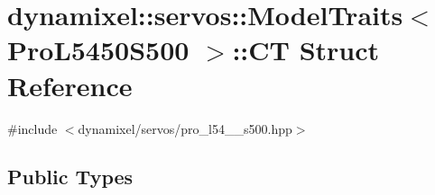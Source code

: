 \hypertarget{structdynamixel_1_1servos_1_1_model_traits_3_01_pro_l5450_s500_01_4_1_1_c_t}{}\section{dynamixel\+:\+:servos\+:\+:Model\+Traits$<$ Pro\+L5450\+S500 $>$\+:\+:C\+T Struct Reference}
\label{structdynamixel_1_1servos_1_1_model_traits_3_01_pro_l5450_s500_01_4_1_1_c_t}


{\ttfamily \#include $<$dynamixel/servos/pro\+\_\+l54\+\_\+\_\+s500.\+hpp$>$}

\subsection*{Public Types}
